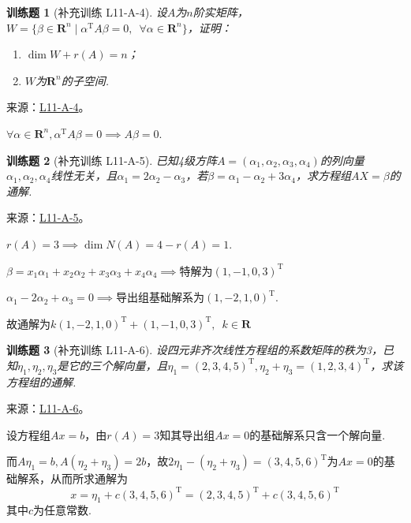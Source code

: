 \documentclass[UTF8,12pt,a4paper,fontset=fandol]{ctexart}
\newtheorem{exercise}{训练题}[section]
\begin{document}
\begin{exercise}[补充训练 L11-A-4]\label{prob:L11-A-4}
设$A$为$n$阶实矩阵，$W=\{\beta\in\mathbf{R}^n \mid \alpha^\mathrm{T}A\beta=0,\enspace \forall \alpha\in\mathbf{R}^n\}$，证明：
        \begin{enumerate}
            \item $\dim W+r(A)=n$；

            \item $W$为$\mathbf{R}^n$的子空间.
        \end{enumerate}
\end{exercise}
\noindent 来源：\href{https://github.com/yhwu-is/Linear-Algebra-Left-Undone/blob/new/%E8%AE%B2%E4%B9%89/%E4%B8%93%E9%A2%98/11%20%E6%9C%9D%E8%8A%B1%E5%A4%95%E6%8B%BE.tex}{L11-A-4}。
\begin{solve}
$\forall \alpha \in \mathbf{R}^n, \alpha^\mathrm{T}A\beta =0\implies A\beta =0$.
\end{solve}

\begin{exercise}[补充训练 L11-A-5]\label{prob:L11-A-5}
已知4级方阵$A=(\alpha_1,\alpha_2,\alpha_3,\alpha_4)$的列向量$\alpha_1,\alpha_2,\alpha_4$线性无关，且$\alpha_1=2\alpha_2-\alpha_3$，若$\beta=\alpha_1-\alpha_2+3\alpha_4$，求方程组$AX=\beta$的通解.
\end{exercise}
\noindent 来源：\href{https://github.com/yhwu-is/Linear-Algebra-Left-Undone/blob/new/%E8%AE%B2%E4%B9%89/%E4%B8%93%E9%A2%98/11%20%E6%9C%9D%E8%8A%B1%E5%A4%95%E6%8B%BE.tex}{L11-A-5}。
\begin{solve}
$r(A)=3\implies \dim{N(A)}=4-r(A)=1$.

          $\beta = x_1\alpha_1+x_2\alpha_2+x_3\alpha_3+x_4\alpha_4\implies$特解为$(1,-1,0,3)^\mathrm{T}$

          $\alpha_1-2\alpha_2+\alpha_3=0\implies$导出组基础解系为$(1,-2,1,0)^\mathrm{T}$.

          故通解为$k(1,-2,1,0)^\mathrm{T}+(1,-1,0,3)^\mathrm{T},\enspace k\in\mathbf{R}$
\end{solve}

\begin{exercise}[补充训练 L11-A-6]\label{prob:L11-A-6}
设四元非齐次线性方程组的系数矩阵的秩为3，已知$\eta_1,\eta_2,\eta_3$是它的三个解向量，且$\eta_1=(2,3,4,5)^\mathrm{T},\eta_2+\eta_3=(1,2,3,4)^\mathrm{T}$，求该方程组的通解.
\end{exercise}
\noindent 来源：\href{https://github.com/yhwu-is/Linear-Algebra-Left-Undone/blob/new/%E8%AE%B2%E4%B9%89/%E4%B8%93%E9%A2%98/11%20%E6%9C%9D%E8%8A%B1%E5%A4%95%E6%8B%BE.tex}{L11-A-6}。
\begin{solve}
设方程组$Ax=b$，由$r(A)=3$知其导出组$Ax=0$的基础解系只含一个解向量.

          而$A\eta_1=b,A(\eta_2+\eta_3)=2b$，故$2\eta_1-(\eta_2+\eta_3)=(3,4,5,6)^\mathrm{T}$为$Ax=0$的基础解系，从而所求通解为
          \[ x = \eta_1+c(3,4,5,6)^\mathrm{T} = (2,3,4,5)^\mathrm{T} + c(3,4,5,6)^\mathrm{T} \]
          其中$c$为任意常数.
\end{solve}
\end{document}
